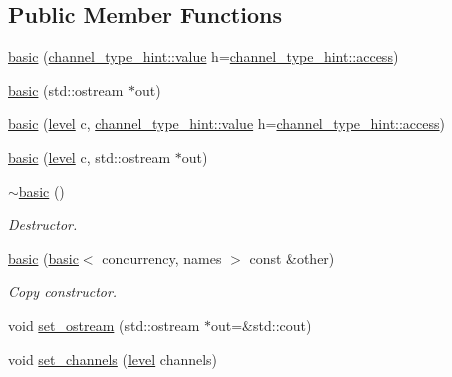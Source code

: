\subsection*{Public Member Functions}
\begin{DoxyCompactItemize}
\item 
\hyperlink{classwebsocketpp_1_1log_1_1basic_a161725427aab2220743211512156810e}{basic} (\hyperlink{structwebsocketpp_1_1log_1_1channel__type__hint_ad12a7f6555b71aabdc4cbec604dc89dd}{channel\+\_\+type\+\_\+hint\+::value} h=\hyperlink{structwebsocketpp_1_1log_1_1channel__type__hint_a8c38587fffbffbfcfc35577734b0d653}{channel\+\_\+type\+\_\+hint\+::access})
\item 
\hyperlink{classwebsocketpp_1_1log_1_1basic_ad1ba9e1e73f035b527f7cbcde6ceb709}{basic} (std\+::ostream $\ast$out)
\item 
\hyperlink{classwebsocketpp_1_1log_1_1basic_aa38b56b9985927e20e54ff618b23409f}{basic} (\hyperlink{namespacewebsocketpp_1_1log_a12d4d17939f102db8c9183d400a41960}{level} c, \hyperlink{structwebsocketpp_1_1log_1_1channel__type__hint_ad12a7f6555b71aabdc4cbec604dc89dd}{channel\+\_\+type\+\_\+hint\+::value} h=\hyperlink{structwebsocketpp_1_1log_1_1channel__type__hint_a8c38587fffbffbfcfc35577734b0d653}{channel\+\_\+type\+\_\+hint\+::access})
\item 
\hyperlink{classwebsocketpp_1_1log_1_1basic_a43ccea903a0da548beace831b8629a1a}{basic} (\hyperlink{namespacewebsocketpp_1_1log_a12d4d17939f102db8c9183d400a41960}{level} c, std\+::ostream $\ast$out)
\item 
\hyperlink{classwebsocketpp_1_1log_1_1basic_ae2070dee0da9ae3ccf0833b59e51eca8}{$\sim$basic} ()
\begin{DoxyCompactList}\small\item\em Destructor. \end{DoxyCompactList}\item 
\hyperlink{classwebsocketpp_1_1log_1_1basic_ace381224e7990da5f3ec7505109fa541}{basic} (\hyperlink{classwebsocketpp_1_1log_1_1basic}{basic}$<$ concurrency, names $>$ const \&other)
\begin{DoxyCompactList}\small\item\em Copy constructor. \end{DoxyCompactList}\item 
void \hyperlink{classwebsocketpp_1_1log_1_1basic_ad35f40223f3a5a1e5650600f00938047}{set\+\_\+ostream} (std\+::ostream $\ast$out=\&std\+::cout)
\item 
void \hyperlink{classwebsocketpp_1_1log_1_1basic_a35e70935ce8b7a30c6eafea45181907a}{set\+\_\+channels} (\hyperlink{namespacewebsocketpp_1_1log_a12d4d17939f102db8c9183d400a41960}{level} channels)

\end{DoxyCompactItemize}
